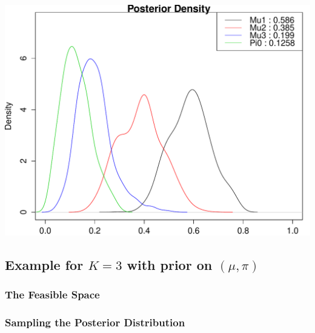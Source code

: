 \documentclass[11 pt, a4paper]{article}  %
\begin{document}
\begin{center}
\includegraphics[scale=0.6]{post_k3.pdf}
\end{center}




%

\subsection{Example for $K=3$ with prior on $(\mu, \pi)$}
\subsubsection{The Feasible Space}
\subsubsection{Sampling the Posterior Distribution}
\end{document}

